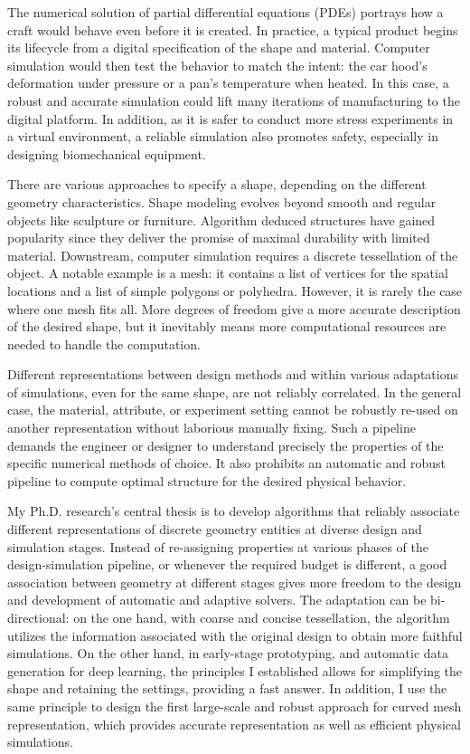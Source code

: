 

The numerical solution of partial differential equations (PDEs) portrays how a craft would behave even before it is created. In practice, a typical product begins its lifecycle from a digital specification of the shape and material. Computer simulation would then test the behavior to match the intent: the car hood's deformation under pressure or a pan's temperature when heated. In this case, a robust and accurate simulation could lift many iterations of manufacturing to the digital platform. In addition, as it is safer to conduct more stress experiments in a virtual environment, a reliable simulation also promotes safety, especially in designing biomechanical equipment. 

There are various approaches to specify a shape, depending on the different geometry characteristics. Shape modeling evolves beyond smooth and regular objects like sculpture or furniture. Algorithm deduced structures have gained popularity since they deliver the promise of maximal durability with limited material. Downstream, computer simulation requires a discrete tessellation of the object. A notable example is a mesh: it contains a list of vertices for the spatial locations and a list of simple polygons or polyhedra. However, it is rarely the case where one mesh fits all. More degrees of freedom give a more accurate description of the desired shape, but it inevitably means more computational resources are needed to handle the computation.

Different representations between design methods and within various adaptations of simulations, even for the same shape, are not reliably correlated. In the general case, the material, attribute, or experiment setting cannot be robustly re-used on another representation without laborious manually fixing. Such a pipeline demands the engineer or designer to understand precisely the properties of the specific numerical methods of choice. It also prohibits an automatic and robust pipeline to compute optimal structure for the desired physical behavior.

My Ph.D. research's central thesis is to develop algorithms that reliably associate different representations of discrete geometry entities at diverse design and simulation stages. Instead of re-assigning properties at various phases of the design-simulation pipeline, or whenever the required budget is different, a good association between geometry at different stages gives more freedom to the design and development of automatic and adaptive solvers. The adaptation can be bi-directional: on the one hand, with coarse and concise tessellation, the algorithm utilizes the information associated with the original design to obtain more faithful simulations. On the other hand, in early-stage prototyping, and automatic data generation for deep learning, the principles I established allows for simplifying the shape and retaining the settings, providing a fast answer. In addition, I use the same principle to design the first large-scale and robust approach for curved mesh representation, which provides accurate representation as well as efficient physical simulations.

